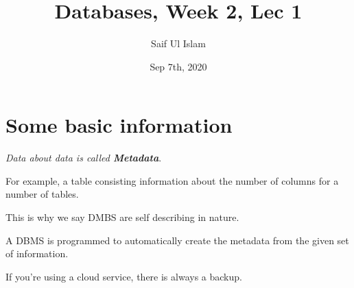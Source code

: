 \documentclass{article}
\author{Saif Ul Islam}
\date{Sep 7th, 2020}
\title{Databases, Week 2, Lec 1}
\begin{document}
    \maketitle

    \tableofcontents

    \section{Some basic information}

    \textit{Data about data is called \textbf{Metadata}}.

    For example, a table consisting information about the number of columns for a number of tables.

    This is why we say DMBS are self describing in nature.

    A DBMS is programmed to automatically create the metadata from the given set of information.

    If you're using a cloud service, there is always a backup.
\end{document}
